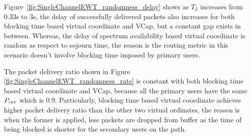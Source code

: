 

Figure~\ref{fig:SingleChannelEWT_randomness_delay} shows as $T_2$ increases from 0.33s to 3s, the delay of successfully delivered packets also increases for both blocking time based virtual coordinate and VCap, but a constant gap exists in between.
Whereas, the delay of spectrum availability based virtual coordinate is random as respect to sojourn time, the reason is the routing metric in this scenario doesn't involve blocking time imposed by primary users.


The packet delivery ratio shown in Figure \ref{fig:SingleChannelEWT_randomness_rate} is constant with both blocking time based virtual coordinate and VCap, because all the primary users have the same $P_{\textsc{\tiny OFF}}$ which is 0.9.
Particularly, blocking time based virtual coordinate achieves higher packet delivery ratio than the other two virtual ordinates, the reason is when the former is applied, less packets are dropped from buffer as the time of being blocked is shorter for the secondary users on the path.







